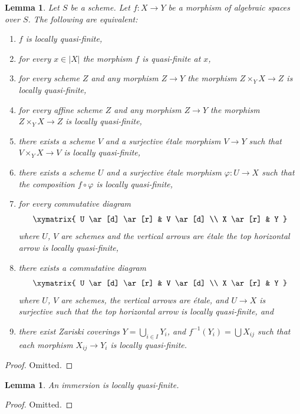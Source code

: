 \documentclass{stacks-project}
\theoremstyle{plain}
\newtheorem{lemma}[subsection]{Lemma}
\theoremstyle{definition}
\theoremstyle{remark}
\numberwithin{equation}{subsection}
\begin{document}
\begin{lemma}
\label{lemma-quasi-finite-local}
Let $S$ be a scheme.
Let $f : X \to Y$ be a morphism of algebraic spaces over $S$.
The following are equivalent:
\begin{enumerate}
\item $f$ is locally quasi-finite,
\item for every $x \in |X|$ the morphism $f$ is quasi-finite at $x$,
\item for every scheme $Z$ and any morphism $Z \to Y$ the morphism
$Z \times_Y X \to Z$ is locally quasi-finite,
\item for every affine scheme $Z$ and any morphism
$Z \to Y$ the morphism $Z \times_Y X \to Z$ is locally quasi-finite,
\item there exists a scheme $V$ and a surjective \'etale morphism
$V \to Y$ such that $V \times_Y X \to V$ is locally quasi-finite,
\item there exists a scheme $U$ and a surjective \'etale morphism
$\varphi : U \to X$ such that the composition $f \circ \varphi$
is locally quasi-finite,
\item for every commutative diagram
$$
\xymatrix{
U \ar[d] \ar[r] & V \ar[d] \\
X \ar[r] & Y
}
$$
where $U$, $V$ are schemes and the vertical arrows are \'etale
the top horizontal arrow is locally quasi-finite,
\item there exists a commutative diagram
$$
\xymatrix{
U \ar[d] \ar[r] & V \ar[d] \\
X \ar[r] & Y
}
$$
where $U$, $V$ are schemes, the vertical arrows are \'etale, and
$U \to X$ is surjective such that the top horizontal arrow is
locally quasi-finite, and
\item there exist Zariski coverings $Y = \bigcup_{i \in I} Y_i$,
and $f^{-1}(Y_i) = \bigcup X_{ij}$ such that
each morphism $X_{ij} \to Y_i$ is locally quasi-finite.
\end{enumerate}
\end{lemma}

\begin{proof}
Omitted.
\end{proof}

\begin{lemma}
\label{lemma-immersion-quasi-finite}
An immersion is locally quasi-finite.
\end{lemma}

\begin{proof}
Omitted.
\end{proof}
\end{document}
